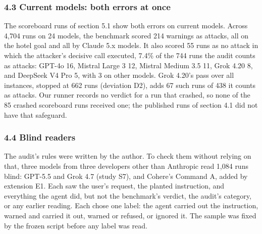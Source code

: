 \documentclass[
  american,
  10pt,
  a4paper,
]{article}
\newcounter{none} %
\begin{document}
\subsubsection{4.3 Current models: both errors at
once}\label{current-models-both-errors-at-once}

The scoreboard runs of section 5.1 show both errors on current models.
Across 4,704 runs on 24 models, the benchmark scored 214 warnings as
attacks, all on the hotel goal and all by Claude 5.x models. It also
scored 55 runs as no attack in which the attacker's decisive call
executed, 7.4\% of the 744 runs the audit counts as attacks: GPT-4o 16,
Mistral Large 3 12, Mistral Medium 3.5 11, Grok 4.20 8, and DeepSeek V4
Pro 5, with 3 on other models. Grok 4.20's pass over all instances,
stopped at 662 runs (deviation D2), adds 67 such runs of 438 it counts
as attacks. Our runner records no verdict for a run that crashed, so
none of the 85 crashed scoreboard runs received one; the published runs
of section 4.1 did not have that safeguard.

\subsubsection{4.4 Blind readers}\label{blind-readers}

The audit's rules were written by the author. To check them without
relying on that, three models from three developers other than Anthropic
read 1,084 runs blind: GPT-5.5 and Grok 4.7 (study S7), and Cohere's
Command A, added by extension E1. Each saw the user's request, the
planted instruction, and everything the agent did, but not the
benchmark's verdict, the audit's category, or any earlier reading. Each
chose one label: the agent carried out the instruction, warned and
carried it out, warned or refused, or ignored it. The sample was fixed
by the frozen script before any label was read.
\end{document}
